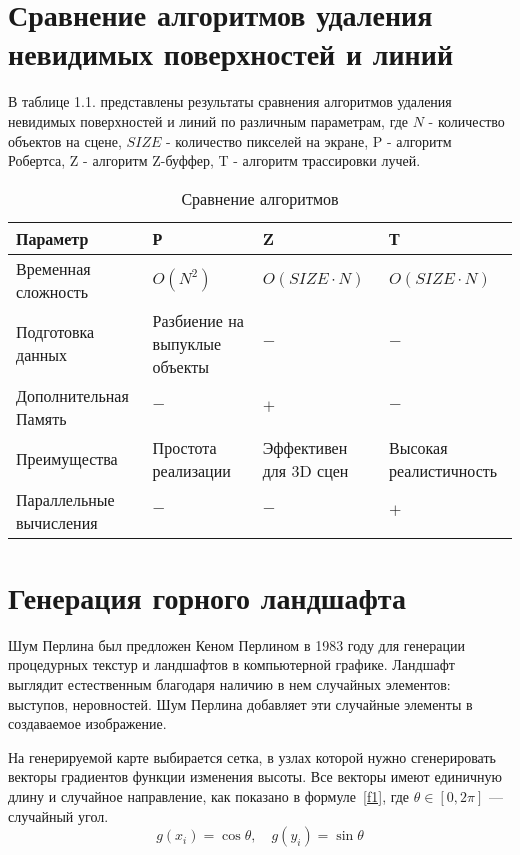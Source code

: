 \section{Сравнение алгоритмов удаления невидимых поверхностей и линий}
В таблице 1.1. представлены результаты сравнения алгоритмов удаления невидимых поверхностей и линий по различным параметрам, где 
$N$ - количество объектов на сцене, $SIZE$ - количество пикселей на экране, P - алгоритм Робертса, Z - алгоритм Z-буффер, T - алгоритм трассировки лучей. 

\begin{table}[h!]
        \small
        \captionsetup{justification=raggedright, singlelinecheck=false, labelsep=endash}
		\caption{Сравнение алгоритмов}
		
		\label{tbl:comparing_algorithms}
		\begin{tabular}{|p{3cm}|p{3cm}|p{3cm}|p{5cm}|}
			 \hline
             Параметр & Р & Z & Т \\
             \hline
             Временная сложность & $O(N^2)$ & $O(SIZE \cdot N)$ & $O(SIZE \cdot N)$ \\
             \hline
             Подготовка данных & Разбиение на выпуклые объекты & $-$ & $-$ \\
             \hline
             Дополнительная Память & $-$ & $+$ & $-$ \\
             \hline
             Преимущества & Простота реализации & Эффективен для 3D сцен & Высокая реалистичность \\
             \hline
             Параллельные вычисления & $-$ & $-$ & $+$ \\ 
             \hline
		\end{tabular}
\end{table}

\section{Генерация горного ландшафта}
Шум Перлина был предложен Кеном Перлином в 1983 году для генерации процедурных текстур и ландшафтов в компьютерной графике. Ландшафт выглядит естественным благодаря наличию в нем случайных элементов: выступов, неровностей. Шум Перлина добавляет эти случайные элементы в создаваемое изображение.

На генерируемой карте выбирается сетка, в узлах которой нужно сгенерировать векторы градиентов функции изменения высоты. Все векторы имеют единичную длину и случайное направление, как показано в формуле~\ref{f1}, где $\theta \in [0, 2\pi]$ — случайный угол.
\begin{equation}
g(x_i) = \cos{\theta} , \quad
g(y_i) = \sin{\theta}
\label{f1}
\end{equation}

